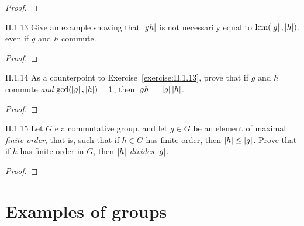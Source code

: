 \begin{proof}
\end{proof}

\begin{exercise}{II.1.13}\label{exercise:II.1.13}
	Give an example showing that $\left\vert{gh}\right\vert$ is not necessarily equal to $\operatorname{lcm}(\left\vert{g}\right\vert, \left\vert{h}\right\vert)$, even if $g$ and $h$ commute.
\end{exercise}

\begin{proof}
\end{proof}

\begin{exercise}{II.1.14}
	As a counterpoint to Exercise~\ref{exercise:II.1.13}, prove that if $g$ and $h$ commute \textit{and} $\gcd(\left\vert{g}\right\vert, \left\vert{h}\right\vert) = 1$, then $\left\vert{gh}\right\vert = \left\vert{g}\right\vert\left\vert{h}\right\vert$.
\end{exercise}

\begin{proof}
\end{proof}

\begin{exercise}{II.1.15}
	Let $G$ e a commutative group, and let $g\in G$ be an element of maximal \textit{finite order}, that is, such that if $h\in G$ has finite order, then $\left\vert{h}\right\vert\leq \left\vert{g}\right\vert$. Prove that if $h$ has finite order in $G$, then $\left\vert{h}\right\vert$ \textit{divides} $\left\vert{g}\right\vert$.
\end{exercise}

\begin{proof}
\end{proof}

\section{Examples of groups}

